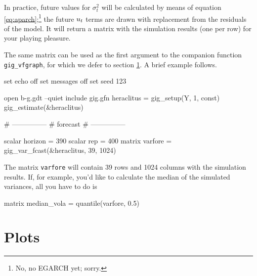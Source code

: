 \documentclass[a4paper,11pt]{article}
\newcommand{\cmd}[1]{\texttt{#1}}
\newcommand{\uhat}{\ensuremath u}
\begin{document}
In practice, future values for $\sigma^2_t$ will be calculated by
means of equation \eqref{eq:aparch};\footnote{No, no EGARCH yet;
  sorry.} the future $\uhat_t$ terms are drawn with replacement from
the residuals of the model.  It will return a matrix with the
simulation results (one per row) for your playing pleasure.
 
The same matrix can be used as the first argument to the companion
function \cmd{gig\_vfgraph}, for which we defer to section
\ref{sec:plots}.  A brief example follows.

\begin{scode}
set echo off
set messages off
set seed 123

open b-g.gdt --quiet
include gig.gfn
heraclitus = gig_setup(Y, 1, const)
gig_estimate(&heraclitus)

# ---------------
#    forecast
# ---------------

scalar horizon = 390
scalar rep = 400
matrix varfore = gig_var_fcast(&heraclitus, 39, 1024)
\end{scode}

The matrix \texttt{varfore} will contain 39 rows and 1024 columns with
the simulation results. If, for example, you'd like to calculate the
median of the simulated variances, all you have to do is 
\begin{code}
matrix median_vola = quantile(varfore, 0.5)  
\end{code}

\section{Plots}
\label{sec:plots}
\end{document}
